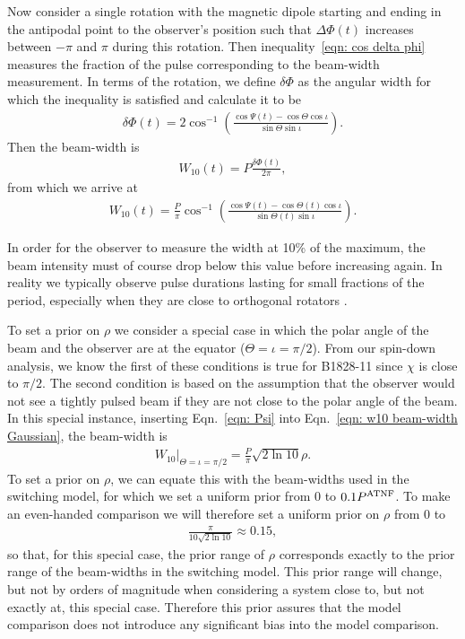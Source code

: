 \documentclass[../full_thesis/full_thesis.tex]{subfiles}
\begin{document}
Now consider a single rotation with the magnetic dipole starting and ending in
the antipodal point to the observer's position such that $\Delta\Phi(t)$ increases
between $-\pi$ and $\pi$ during this rotation. Then inequality~\eqref{eqn: cos delta phi} measures the fraction of the pulse corresponding to
the beam-width measurement. In terms of the rotation, we define $\delta\Phi$ as
the angular width for which the inequality is satisfied and calculate it to be
\begin{align}
\delta\Phi(t) = 2\cos^{-1}\left(
\frac{\cos\Psi(t)-\cos\Theta\cos\iota}
    {\sin\Theta\sin\iota}
\right).
\end{align}
Then the beam-width is
\begin{align}
W_{10}(t) = P \frac{\delta\Phi(t)}{2\pi},
\end{align}
from which we arrive at
\begin{align}
W_{10}(t) = \frac{P}{\pi} \cos^{-1}\left(
\frac{\cos \Psi(t) - \cos\Theta(t)\cos\iota}{\sin\Theta(t)\sin\iota}
\right).
\label{eqn: w10 beam-width Gaussian}
\end{align}

In order for the observer to measure the width at 10\% of the maximum, the beam
intensity must of course drop below this value before increasing again. In
reality we typically observe pulse durations lasting for small fractions of the
period, especially when they are close to orthogonal rotators \citep{Lyne1988}.

To set a prior on $\rho$ we consider a special case in which the polar angle of
the beam and the observer are at the equator ($\Theta=\iota=\pi/2$). From our
spin-down analysis, we know the first of these conditions is true for B1828-11
since $\chi$ is close to $\pi/2$. The second condition is based on the assumption
that the observer would not see a tightly pulsed beam if they are not close to the
polar angle of the beam. In this special instance, inserting
Eqn.~\eqref{eqn: Psi} into Eqn.~\eqref{eqn: w10 beam-width Gaussian}, the beam-width is
\begin{align}
W_{10} \bigg|_{\Theta=\iota=\pi/2} = \frac{P}{\pi}\sqrt{2\ln10} \rho.
\end{align}
To set a prior on $\rho$, we can equate this with the beam-widths used in the
switching model, for which we set a uniform prior from $0$ to $0.1P^{\mathrm{ATNF}}$.
To make an even-handed comparison we will therefore set a uniform prior on
$\rho$ from 0 to
\begin{align}
\frac{\pi}{10\sqrt{2\ln10}} \approx 0.15,
\label{eqn: rho prior}
\end{align}
so that, for this special case, the prior range of $\rho$ corresponds exactly
to the prior range of the beam-widths in the switching model.
This prior range will change, but not by orders of magnitude when
considering a system close to, but not exactly at, this special case. Therefore
this prior assures that the model comparison does not introduce any significant
bias into the model comparison.
\end{document}
